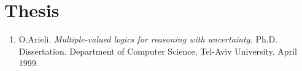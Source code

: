 \documentclass{article}
\begin{document}
\section*{Thesis}

\begin{enumerate}


   \item O.Arieli.
         {\em Multiple-valued logics for reasoning with uncertainty.\/}
         Ph.D. Dissertation. Department of Computer Science, Tel-Aviv University, April 1999.

\end{enumerate}
\end{document}
